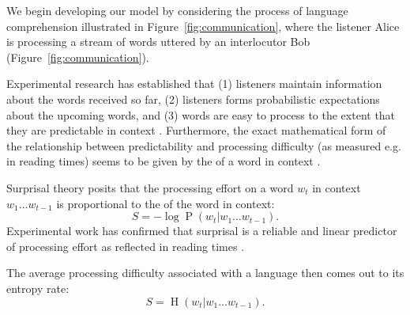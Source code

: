 We begin developing our model by considering the process of language comprehension illustrated in Figure~\ref{fig:communication}, where the listener Alice is processing a stream of words uttered by an interlocutor Bob (Figure~\ref{fig:communication}).


Experimental research has established that (1) listeners maintain information about the words received so far, (2) listeners forms probabilistic expectations about the upcoming words, and (3) words are easy to process to the extent that they are predictable in context . Furthermore, the exact mathematical form of the relationship between predictability and processing difficulty (as measured e.g. in reading times) seems to be given by the  of a word in context \cite{hale2001probabilistic,levy2008expectation,smith2013effect}.


Surprisal theory \citep{hale-probabilistic-2001, levy-expectation-based-2008} posits that the processing effort on a word $w_t$ in context $w_1\dots w_{t-1}$ is proportional to the  of the word in context:
\begin{equation}
S = -\log \operatorname{P}(w_t|w_1\dots w_{t-1})\label{eq:surp}.
\end{equation}
Experimental work has confirmed that surprisal is a reliable and linear predictor of processing effort as reflected in reading times \citep{smith-effect-2013}.

The average processing difficulty associated with a language then comes out to its entropy rate:
\begin{equation}
	S = \operatorname{H}(w_t|w_1\dots w_{t-1}).
\end{equation}




